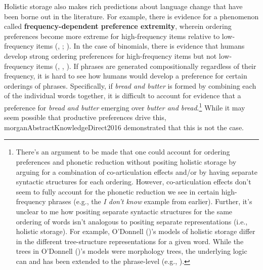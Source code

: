 \documentclass[
  12pt,
]{scrartcl}
\begin{document}
Holistic storage also makes rich predictions about language change that
have been borne out in the literature. For example, there is evidence
for a phenomenon called \textbf{frequency-dependent preference
extremity}, wherein ordering preferences become more extreme for
high-frequency items relative to low-frequency items
(,
;
). In the case of binomials, there is evidence that humans develop
strong ordering preferences for high-frequency items but not
low-frequency items
(, ,
).
If phrases are generated compositionally regardless of their frequency,
it is hard to see how humans would develop a preference for certain
orderings of phrases. Specifically, if \emph{bread and butter} is formed
by combining each of the individual words together, it is difficult to
account for evidence that a preference for \emph{bread and butter}
emerging over \emph{butter and bread}.\footnote{There's an argument to
  be made that one could account for ordering preferences and phonetic
  reduction without positing holistic storage by arguing for a
  combination of co-articulation effects and/or by having separate
  syntactic structures for each ordering. However, co-articulation
  effects don't seem to fully account for the phonetic reduction we see
  in certain high-frequency phrases (e.g., the \emph{I don't know}
  example from earlier). Further, it's unclear to me how positing
  separate syntactic structures for the same ordering of words isn't
  analogous to positing separate representations (i.e., holistic
  storage). For example, O'Donnell
  ()'s models
  of holistic storage differ in the different tree-structure
  representations for a given word. While the trees in O'Donnell
  ()'s models
  were morphology trees, the underlying logic can and has been extended
  to the phrase-level (e.g.,
  ).} While
it may seem possible that productive preferences drive this,
morganAbstractKnowledgeDirect2016 demonstrated that this is not the
case.
\end{document}
